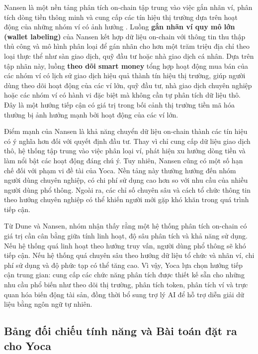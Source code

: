 Nansen là một nền tảng phân tích on-chain tập trung vào việc gắn nhãn ví, phân tích dòng tiền thông minh và cung cấp các tín hiệu thị trường dựa trên hoạt động của những nhóm ví có ảnh hưởng \cite{nansenai}. Luồng \textbf{gắn nhãn ví quy mô lớn (wallet labeling)} của Nansen kết hợp dữ liệu on-chain với thông tin thu thập thủ công và mô hình phân loại để gán nhãn cho hơn một trăm triệu địa chỉ theo loại thực thể như sàn giao dịch, quỹ đầu tư hoặc nhà giao dịch cá nhân. Dựa trên tập nhãn này, luồng \textbf{theo dõi smart money} tổng hợp hoạt động mua bán của các nhóm ví có lịch sử giao dịch hiệu quả thành tín hiệu thị trường, giúp người dùng theo dõi hoạt động của các ví lớn, quỹ đầu tư, nhà giao dịch chuyên nghiệp hoặc các nhóm ví có hành vi đặc biệt mà không cần tự phân tích dữ liệu thô. Đây là một hướng tiếp cận có giá trị trong bối cảnh thị trường tiền mã hóa thường bị ảnh hưởng mạnh bởi hoạt động của các ví lớn.

Điểm mạnh của Nansen là khả năng chuyển dữ liệu on-chain thành các tín hiệu có ý nghĩa hơn đối với quyết định đầu tư. Thay vì chỉ cung cấp dữ liệu giao dịch thô, hệ thống tập trung vào việc phân loại ví, phát hiện xu hướng dòng tiền và làm nổi bật các hoạt động đáng chú ý. Tuy nhiên, Nansen cũng có một số hạn chế đối với phạm vi đề tài của Yoca. Nền tảng này thường hướng đến nhóm người dùng chuyên nghiệp, có chi phí sử dụng cao hơn so với nhu cầu của nhiều người dùng phổ thông. Ngoài ra, các chỉ số chuyên sâu và cách tổ chức thông tin theo hướng chuyên nghiệp có thể khiến người mới gặp khó khăn trong quá trình tiếp cận.

Từ Dune và Nansen, nhóm nhận thấy rằng một hệ thống phân tích on-chain có giá trị cần cân bằng giữa tính linh hoạt, độ sâu phân tích và khả năng sử dụng. Nếu hệ thống quá linh hoạt theo hướng truy vấn, người dùng phổ thông sẽ khó tiếp cận. Nếu hệ thống quá chuyên sâu theo hướng dữ liệu tổ chức và nhãn ví, chi phí sử dụng và độ phức tạp có thể tăng cao. Vì vậy, Yoca lựa chọn hướng tiếp cận trung gian: cung cấp các chức năng phân tích được thiết kế sẵn cho những nhu cầu phổ biến như theo dõi thị trường, phân tích token, phân tích ví và trực quan hóa biến động tài sản, đồng thời bổ sung trợ lý AI để hỗ trợ diễn giải dữ liệu bằng ngôn ngữ tự nhiên.

\subsection{Bảng đối chiếu tính năng và Bài toán đặt ra cho Yoca}

